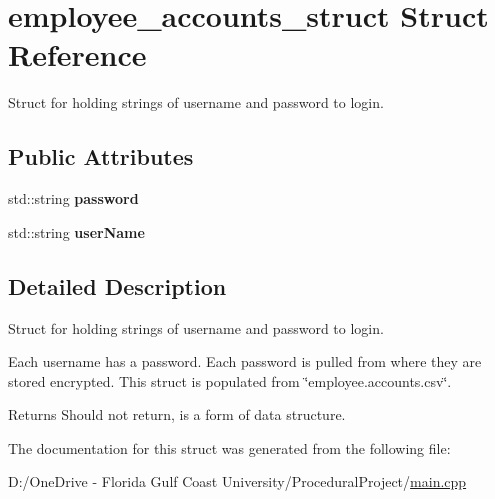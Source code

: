 \hypertarget{structemployee__accounts__struct}{}\section{employee\+\_\+accounts\+\_\+struct Struct Reference}
\label{structemployee__accounts__struct}


Struct for holding strings of username and password to login.  


\subsection*{Public Attributes}
\begin{DoxyCompactItemize}
\item 
\mbox{\label{structemployee__accounts__struct_aa641053360f24dea26f74a5e8e49e6a9}} 
std\+::string {\bfseries password}
\item 
\mbox{\label{structemployee__accounts__struct_aa9112397a438b1c38004004080e128cd}} 
std\+::string {\bfseries user\+Name}
\end{DoxyCompactItemize}


\subsection{Detailed Description}
Struct for holding strings of username and password to login. 

Each username has a password. Each password is pulled from where they are stored encrypted. This struct is populated from \char`\"{}employee.\+accounts.\+csv\char`\"{}.

\begin{DoxyReturn}{Returns}
Should not return, is a form of data structure. 
\end{DoxyReturn}


The documentation for this struct was generated from the following file\+:\begin{DoxyCompactItemize}
\item 
D\+:/\+One\+Drive -\/ Florida Gulf Coast University/\+Procedural\+Project/\mbox{\hyperlink{main_8cpp}{main.\+cpp}}\end{DoxyCompactItemize}

